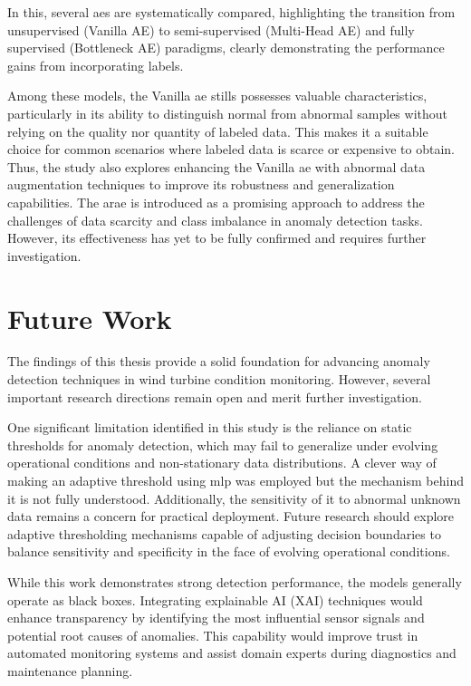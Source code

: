 In this, several \glspl{ae} are systematically compared, highlighting the transition from unsupervised (Vanilla AE) to semi-supervised (Multi-Head AE) and fully supervised (Bottleneck AE) paradigms, clearly demonstrating the performance gains from incorporating labels.

Among these models, the Vanilla \gls{ae} stills possesses valuable characteristics, particularly in its ability to distinguish normal from abnormal samples without relying on the quality nor quantity of labeled data.
This makes it a suitable choice for common scenarios where labeled data is scarce or expensive to obtain.
Thus, the study also explores enhancing the Vanilla \gls{ae} with abnormal data augmentation techniques to improve its robustness and generalization capabilities.
The \gls{arae} is introduced as a promising approach to address the challenges of data scarcity and class imbalance in anomaly detection tasks.
However, its effectiveness has yet to be fully confirmed and requires further investigation.


\section{Future Work}
The findings of this thesis provide a solid foundation for advancing anomaly detection techniques in wind turbine condition monitoring. However, several important research directions remain open and merit further investigation.

One significant limitation identified in this study is the reliance on static thresholds for anomaly detection, which may fail to generalize under evolving operational conditions and non-stationary data distributions.
A clever way of making an adaptive threshold using \gls{mlp} was employed but the mechanism behind it is not fully understood.
Additionally, the sensitivity of it to abnormal unknown data remains a concern for practical deployment.
Future research should explore adaptive thresholding mechanisms capable of adjusting decision boundaries to balance sensitivity and specificity in the face of evolving operational conditions.

While this work demonstrates strong detection performance, the models generally operate as black boxes. 
Integrating explainable AI (XAI) techniques would enhance transparency by identifying the most influential sensor signals and potential root causes of anomalies. 
This capability would improve trust in automated monitoring systems and assist domain experts during diagnostics and maintenance planning.

